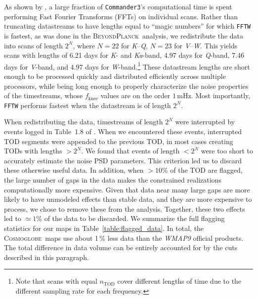 \documentclass[twocolumn]{../../common/aa}
\def\commanderthree{\texttt{Commander3}}
\newcommand{\bp}{\textsc{BeyondPlanck}}
\newcommand{\Cosmoglobe}{\textsc{Cosmoglobe}}
\newcommand{\K}[0]{\textit K}
\newcommand{\Ka}[0]{\textit{Ka}}
\newcommand{\Q}[0]{\textit Q}
\newcommand{\V}[0]{\textit V}
\newcommand{\W}[0]{\textit W}
\begin{document}
As shown by \citet{bp03}, a large fraction of \commanderthree's computational time is spent performing Fast Fourier Transforms (FFTs) on individual scans. Rather than truncating datastreams to have lengths equal to ``magic numbers'' for which \texttt{FFTW} \citep{FFTW05} is fastest, as was done in the \bp\ analysis, 
we redistribute the data into scans of length $2^N$, where $N=22$ for \K--\Q, $N=23$ for \V--\W. This yields scans with lengths of 6.21 days for \K- and \Ka-band, 4.97 days for \Q-band, 7.46 days for \V-band, and 4.97 days for \W-band.\footnote{Note that scans with equal $n_\mathrm{TOD}$ cover different lengths of time due to the different sampling rate for each frequency.}
These datastream lengths are short enough to be processed quickly and distributed efficiently across multiple processors, while being long enough to properly characterize the noise properties of the timestreams, whose $f_\mathrm{knee}$ values are on the order $1\,\mathrm{mHz}$. Most importantly, \texttt{FFTW} performs fastest when the datastream is of length $2^N$. 

When redistributing the data, timestreams of length $2^N$ were interrupted by events logged in Table~1.8 of \citet{wmapexsupp}.
When we encountered these events, interrupted TOD segments were appended to the previous TOD, in most cases creating TODs with lengths $>2^N$. We found that events of length $<2^N$ were too short to accurately estimate the noise PSD parameters. This criterion led us to discard these otherwise useful data. In addition, when $>10\%$ of the TOD are flagged, the large number of gaps in the data makes the constrained realizations computationally more expensive. Given that data near many large gaps are more likely to have unmodeled effects than stable data, and they are more expensive to process, we chose to remove these from the analysis. Together, these two effects led to $\simeq1\%$ of the data to be discarded. We summarize the full flagging statistics for our maps in Table~\ref{table:flagged_data}. In total, the \Cosmoglobe\ maps use about 1\,\% less data than the \textit{WMAP9} official products. The total difference in data volume can be entirely accounted for by the cuts described in this paragraph.



\end{document}
